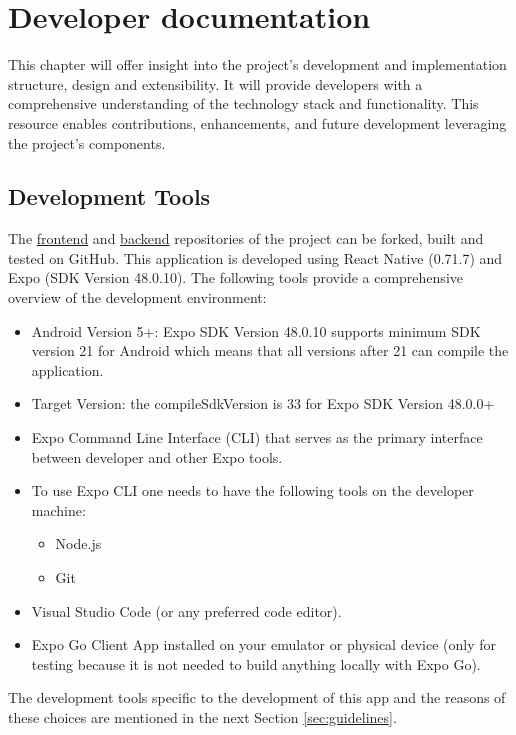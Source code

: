 \chapter{Developer documentation}
\label{ch:impl}

This chapter will offer insight into the project's development and implementation structure, design and extensibility. It will provide developers with a comprehensive understanding of the technology stack and functionality. This resource enables contributions, enhancements, and future development leveraging the project's components.

\section{Development Tools}\label{sec:dev_tools}
The \href{https://github.com/aamnatayyab6/StudyBuddy_FE.git}{frontend} and \href{https://github.com/mastertimisensei/StudyBuddyBE.git}{backend} repositories of the project can be forked, built and tested on GitHub.
This application is developed using React Native (0.71.7) and Expo (SDK Version 48.0.10). The following tools provide a comprehensive overview of the development environment:
\begin{itemize}
    \item Android Version 5+: Expo SDK Version 48.0.10 supports minimum SDK version 21 for Android which means that all versions after 21 can compile the application.
    \item Target Version: the compileSdkVersion is 33 for Expo SDK Version 48.0.0+ \cite{ExpoDoc}
    \item Expo Command Line Interface (CLI) that serves as the primary interface between developer and other Expo tools.
    \item To use Expo CLI one needs to have the following tools on the developer machine:
    \begin{itemize}
        \item Node.js 
        \item Git
    \end{itemize}
    \item Visual Studio Code (or any preferred code editor).
    \item Expo Go Client App installed on your emulator or physical device (only for testing because it is not needed to build anything locally with Expo Go).
\end{itemize}
The development tools specific to the development of this app and the reasons of these choices are mentioned in the next Section \ref{sec:guidelines}.

